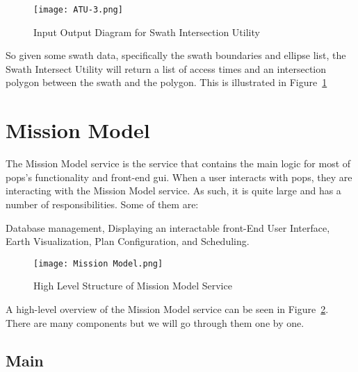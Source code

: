 \begin{figure}[h]
    \centering
    \texttt{[image: ATU-3.png]} 
    \caption{Input Output Diagram for Swath Intersection Utility}
    \label{fig:atu-3} 
\end{figure}

So given some swath data, specifically the swath boundaries and ellipse list,
the Swath Intersect Utility will return a list of access times and an
intersection polygon between the swath and the polygon. This is illustrated in
Figure~\ref{fig:atu-3}


\section{Mission Model}
 
The Mission Model service is the service that contains the main logic for most
of \gls{pops}'s functionality and front-end \gls{gui}. When a user interacts
with \gls{pops}, they are interacting with the Mission Model service. As such,
it is quite large and has a number of responsibilities. Some of them are:

\begin{outline} 
    \1 Database management,
    \1 Displaying an interactable front-End User Interface,
    \1 Earth Visualization,
    \1 Plan Configuration, and
    \1 Scheduling.
\end{outline}


\begin{figure}[h]
    \centering
    \texttt{[image: Mission Model.png]} 
    \caption{High Level Structure of Mission Model Service}
    \label{fig:mission_model} 
\end{figure}

A high-level overview of the Mission Model service can be seen in
Figure~\ref{fig:mission_model}. There are many components but we will go
through them one by one.

\subsection{Main} 

